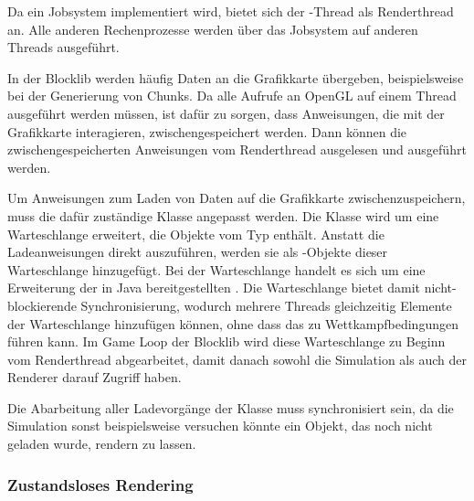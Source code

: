 Da ein Jobsystem implementiert wird, bietet sich der -Thread als Renderthread an. Alle anderen Rechenprozesse werden über das Jobsystem auf anderen Threads ausgeführt.

In der Blocklib werden häufig Daten an die Grafikkarte übergeben, beispielsweise bei der Generierung von Chunks. Da alle Aufrufe an OpenGL auf einem Thread ausgeführt werden müssen, ist dafür zu sorgen, dass Anweisungen, die mit der Grafikkarte interagieren, zwischengespeichert werden. Dann können die zwischengespeicherten Anweisungen vom Renderthread ausgelesen und ausgeführt werden. 

Um Anweisungen zum Laden von Daten auf die Grafikkarte zwischenzuspeichern, muss die dafür zuständige Klasse  angepasst werden. Die Klasse wird um eine Warteschlange erweitert, die Objekte vom Typ  enthält. Anstatt die Ladeanweisungen direkt auszuführen, werden sie als -Objekte dieser Warteschlange hinzugefügt. Bei der Warteschlange handelt es sich um eine Erweiterung der in Java bereitgestellten . Die Warteschlange bietet damit nicht-blockierende Synchronisierung, wodurch mehrere Threads gleichzeitig Elemente der Warteschlange hinzufügen können, ohne dass das zu Wettkampfbedingungen führen kann. Im Game Loop der Blocklib wird diese Warteschlange zu Beginn vom Renderthread abgearbeitet, damit danach sowohl die Simulation als auch der Renderer darauf Zugriff haben.

Die Abarbeitung aller Ladevorgänge der Klasse  muss synchronisiert sein, da die Simulation sonst beispielsweise versuchen könnte ein Objekt, das noch nicht geladen wurde, rendern zu lassen. 






\subsubsection{Zustandsloses Rendering}